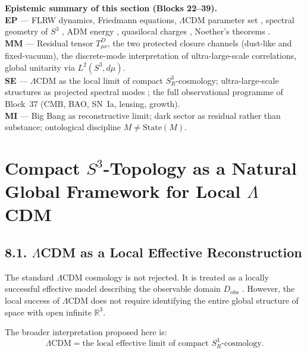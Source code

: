 \documentclass[12pt,a4paper]{article}
\theoremstyle{definition}
\begin{document}
\medskip
\begin{tcolorbox}[colback=gray!4,colframe=gray!35,boxrule=0.4pt,arc=2pt,
  left=8pt,right=8pt,top=6pt,bottom=6pt,fontupper=\small]
\textbf{Epistemic summary of this section (Blocks 22–39).}\\[4pt]
\colorbox{clEstab}{\textbf{EP}} — FLRW dynamics, Friedmann equations,
$\Lambda$CDM parameter set \cite{Planck2020}, spectral geometry of $S^3$
\cite{Berger2003}, ADM energy \cite{Wald1984}, quasilocal charges
\cite{Brown1993}, Noether's theorems \cite{Noether1918}.\\[3pt]
\colorbox{clModel}{\textbf{MM}} — Residual tensor $T^D_{\mu\nu}$, the two
protected closure channels (dust-like and fixed-vacuum), the discrete-mode
interpretation of ultra-large-scale correlations, global unitarity via
$L^2(S^3,d\mu)$.\\[3pt]
\colorbox{clSpec}{\textbf{SE}} — $\Lambda\mathrm{CDM}$ as the local limit of
compact $S^3_R$-cosmology; ultra-large-scale structures as projected spectral
modes \cite{LumenetRoukema1995,Cornishetal2004,Lopezetal2024}; the full
observational programme of Block~37 (CMB, BAO, SN~Ia, lensing, growth).\\[3pt]
\colorbox{clMeta}{\textbf{MI}} — Big Bang as reconstructive limit; dark sector
as residual rather than substance; ontological discipline
$M\neq\mathrm{State}(M)$.
\end{tcolorbox}

\section{Compact \(S^3\)-Topology as a Natural Global Framework for Local \(\Lambda\)CDM}

\subsection*{8.1. \(\Lambda\)CDM as a Local Effective Reconstruction}

The standard \(\Lambda\)CDM cosmology is not rejected. It is treated as a locally successful effective model describing the observable domain \(D_{\mathrm{obs}}\) \cite{Planck2020,Peebles1993}. However, the local success of \(\Lambda\)CDM does not require identifying the entire global structure of space with open infinite \(\mathbb R^3\).

The broader interpretation proposed here is:
\[
\Lambda\mathrm{CDM}
=
\text{the local effective limit of compact } S^3_R\text{-cosmology}.
\]
\end{document}
